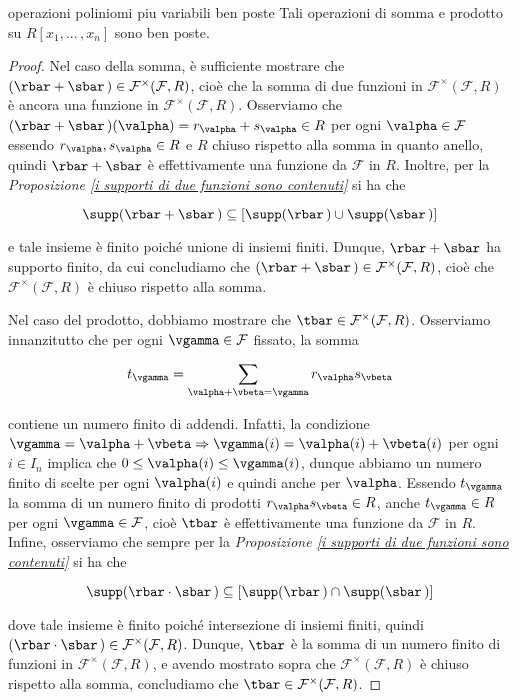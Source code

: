\begin{prop}[]{operazioni poliniomi piu variabili ben poste} 
  Tali operazioni di somma e prodotto su $R[x_1,...\,,x_n]$ sono ben poste.
\end{prop}
\vspace{-4mm}
\begin{proof}
  Nel caso della somma, è sufficiente mostrare che $(\rbar + \sbar\,) \in \mathcal{F}^{\times}(\mathcal{F},R)$, 
  cioè che la somma di due funzioni in $\mathcal{F}^{\times}(\mathcal{F},R)$ è ancora una funzione in $\mathcal{F}^{\times}(\mathcal{F},R)$. 
  Osserviamo che $(\rbar + \sbar\,)(\valpha)=r_{\valpha}+s_{\valpha}\in R$ per ogni $\valpha\in \mathcal{F}$ 
  essendo $r_{\valpha}, s_{\valpha}\in R$ e $R$ chiuso rispetto alla somma in quanto anello, 
  quindi $\rbar + \sbar$ è effettivamente una funzione da $\mathcal{F}$ in $R$. 
  Inoltre, per la \emph{Proposizione \ref{i supporti di due funzioni sono contenuti}} si ha che 

  $$\supp(\rbar+\sbar\,)\subseteq [\supp(\rbar\,) \cup \supp(\sbar\,)]$$ 

  \noindent e tale insieme è finito poiché unione di insiemi finiti. Dunque, $\rbar + \sbar$ ha supporto finito, 
  da cui concludiamo che $(\rbar + \sbar\,) \in \mathcal{F}^{\times}(\mathcal{F},R)$, 
  cioè che $\mathcal{F}^{\times}(\mathcal{F},R)$ è chiuso rispetto alla somma.

  \vspace{1.5mm}

  \noindent Nel caso del prodotto, dobbiamo mostrare che $\tbar\in \mathcal{F}^{\times}(\mathcal{F},R)$. 
  Osserviamo innanzitutto che per ogni $\vgamma\in \mathcal{F}$ fissato, la somma 

  $$t_{\vgamma} = \sum\limits_{\valpha+\vbeta=\vgamma} r_{\valpha}s_{\vbeta}$$ 

  \noindent contiene un numero finito di addendi. Infatti, la condizione $\vgamma=\valpha+\vbeta\Rightarrow \vgamma(i)=\valpha(i)+\vbeta(i)$ 
  per ogni $i\in I_n$ implica che $0\leq \valpha(i) \leq \vgamma(i)$, dunque abbiamo un numero finito di scelte per ogni $\valpha(i)$ 
  e quindi anche per $\valpha$. Essendo $t_{\vgamma}$ la somma di un numero finito di prodotti $r_{\valpha}s_{\vbeta}\in R$, 
  anche $t_{\vgamma}\in R$ per ogni $\vgamma\in \mathcal{F}$, cioè $\tbar$ è effettivamente una funzione da $\mathcal{F}$ in $R$. 
  Infine, osserviamo che sempre per la \emph{Proposizione \ref{i supporti di due funzioni sono contenuti}} si ha che 

  $$\supp(\rbar\cdot \sbar\,)\subseteq [\supp(\rbar\,) \cap \supp(\sbar\,)]$$ 

  \noindent dove tale insieme è finito poiché intersezione di insiemi finiti, quindi $(\rbar\cdot \sbar\,) \in \mathcal{F}^{\times}(\mathcal{F},R)$. 
  Dunque, $\tbar$ è la somma di un numero finito di funzioni in $\mathcal{F}^{\times}(\mathcal{F},R)$, 
  e avendo mostrato sopra che $\mathcal{F}^{\times}(\mathcal{F},R)$ è chiuso rispetto alla somma, 
  concludiamo che $\tbar\in \mathcal{F}^{\times}(\mathcal{F},R)$.
\end{proof}

